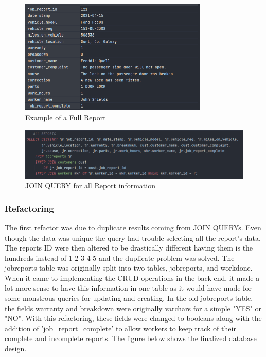 \begin{figure}[H]
    \caption{Example of a Full Report}
    \label{image:dbReport}
    \centering
    \includegraphics[width=0.8\textwidth]{images/database/job_report.png}
\end{figure}

\begin{figure}[H]
    \caption{JOIN QUERY  for all Report information}
    \label{image:join}
    \centering
    \includegraphics[width=1.0\textwidth]{images/database/raw_mysql_join.png}
\end{figure}

\subsubsection{Refactoring}
The first refactor was due to duplicate results coming from JOIN QUERYs. Even though the data was unique the query had trouble selecting all the report's data. The reports ID were then altered to be drastically different having them is the hundreds instead of 1-2-3-4-5 and the duplicate problem was solved. The jobreports table was originally split into two tables, jobreports, and workdone. When it came to implementing the CRUD operations in the back-end, it made a lot more sense to have this information in one table as it would have made for some monstrous queries for updating and creating. In the old jobreports table, the fields warranty and breakdown were originally varchars for a simple "YES" or "NO". With this refactoring, these fields were changed to booleans along with the addition of 'job\_report\_complete' to allow workers to keep track of their complete and incomplete reports. The figure below shows the finalized database design.

